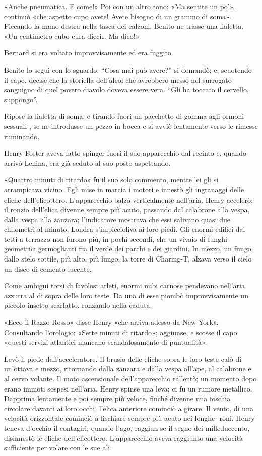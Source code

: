 \documentclass[
a5paper, %
10pt, %
twoside, 
onecolumn, %
openany, %
]{memoir}
\begin{document}
«Anche pneumatica. E come!» Poi con un altro tono: «Ma sentite un po’», continuò «che aspetto cupo avete! Avete bisogno di un grammo di soma». Ficcando la mano destra nella tasca dei calzoni, Benito ne trasse una fialetta. «Un centimetro cubo cura dieci… Ma dico!»

Bernard si era voltato improvvisamente ed era fuggito.

Benito lo seguì con lo sguardo. “Cosa mai può avere?” si domandò; e, scuotendo il capo, decise che la storiella dell’alcol che avrebbero messo nel surrogato sanguigno di quel povero diavolo doveva essere vera. “Gli ha toccato il cervello, suppongo”.

Ripose la fialetta di soma, e tirando fuori un pacchetto di gomma agli ormoni sessuali , se ne introdusse un pezzo in bocca e si avviò lentamente verso le rimesse ruminando.

Henry Foster aveva fatto spinger fuori il suo apparecchio dal recinto e, quando arrivò Lenina, era già seduto al suo posto aspettando.

«Quattro minuti di ritardo» fu il suo solo commento, mentre lei gli si arrampicava vicino. Egli mise in marcia i motori e innestò gli ingranaggi delle eliche dell’elicottero. L’apparecchio balzò verticalmente nell’aria. Henry accelerò; il ronzio dell’elica divenne sempre più acuto, passando dal calabrone alla vespa, dalla vespa alla zanzara; l’indicatore mostrava che essi salivano quasi due chilometri al minuto. Londra s’impiccioliva ai loro piedi. Gli enormi edifici dai tetti a terrazzo non furono più, in pochi secondi, che un vivaio di funghi geometrici germoglianti fra il verde dei parchi e dei giardini. In mezzo, un fungo dallo stelo sottile, più alto, più lungo, la torre di Charing-T, alzava verso il cielo un disco di cemento lucente.

Come ambigui torsi di favolosi atleti, enormi nubi carnose pendevano nell’aria azzurra al di sopra delle loro teste. Da una di esse piombò improvvisamente un piccolo insetto scarlatto, ronzando nella caduta.

«Ecco il Razzo Rosso» disse Henry «che arriva adesso da New York». Consultando l’orologio: «Sette minuti di ritardo»; aggiunse, e scosse il capo «questi servizi atlantici mancano scandalosamente di puntualità».

Levò il piede dall’acceleratore. Il brusio delle eliche sopra le loro teste calò di un’ottava e mezzo, ritornando dalla zanzara e dalla vespa all’ape, al calabrone e al cervo volante. Il moto ascensionale dell’apparecchio rallentò; un momento dopo erano immoti sospesi nell’aria. Henry spinse una leva; ci fu un rumore metallico. Dapprima lentamente e poi sempre più veloce, finché divenne una foschia circolare davanti ai loro occhi, l’elica anteriore cominciò a girare. Il vento, di una velocità orizzontale cominciò a fischiare sempre più acuto nei longhe- roni. Henry teneva d’occhio il contagiri; quando l’ago, raggiun se il segno dei milleduecento, disinnestò le eliche dell’elicottero. L’apparecchio aveva raggiunto una velocità sufficiente per volare con le sue ali.
\end{document}
